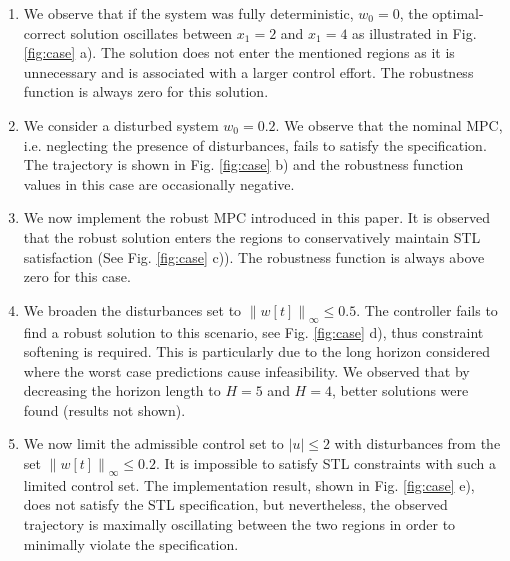 \documentclass[letterpaper, 10 pt, conference]{ieeeconf}
\begin{document}
\begin{enumerate}

\item We observe that if the system was fully deterministic, $w_0=0$, the optimal-correct solution oscillates between $x_1=2$ and $x_1=4$ as illustrated in Fig. \ref{fig:case} a). The solution does not enter the mentioned regions as it is unnecessary and is associated with a larger control effort. The robustness function is always zero for this solution. 

\item We consider a disturbed system $w_0 = 0.2$. We observe that the nominal MPC, i.e. neglecting the presence of disturbances, fails to satisfy the specification. The trajectory is shown in Fig. \ref{fig:case} b) and the robustness function values in this case are occasionally negative.

\item We now implement the robust MPC introduced in this paper. It is observed that the robust solution enters the regions to conservatively maintain STL satisfaction (See Fig. \ref{fig:case} c)). The robustness function is always above zero for this case.

\item We broaden the disturbances set to  $\left \|w[t] \right \|_\infty \le 0.5$. The controller fails to find a robust solution to this scenario, see Fig. \ref{fig:case} d), thus constraint softening is required. This is particularly due to the long horizon considered where the worst case predictions cause infeasibility.  We observed that by decreasing the horizon length to $H=5$ and $H=4$, better solutions were found (results not shown). 

\item We now limit the admissible control set to $\left | u \right | \le 2$ with disturbances from the set $\left \|w[t] \right \|_\infty \le 0.2$. It is impossible to satisfy STL constraints with such a limited control set. The implementation result, shown in Fig. \ref{fig:case} e), does not satisfy the STL specification, but nevertheless, the observed trajectory is maximally oscillating between the two regions in order to minimally violate the specification. 
\end{enumerate}
\end{document}
